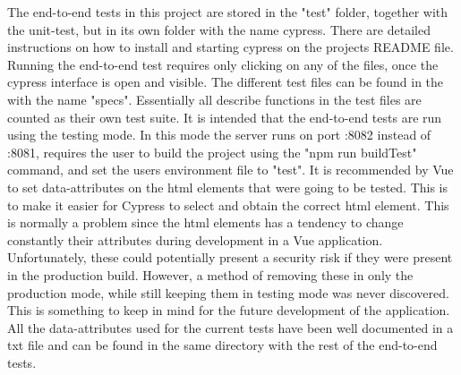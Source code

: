 The end-to-end tests in this project are stored in the "test" folder, together with the unit-test, but in its own folder with the name cypress. There are detailed instructions on how to install and starting cypress on the projects README file. Running the end-to-end test requires only clicking on any of the files, once the cypress interface is open and visible. The different test files can be found in the with the name "specs". Essentially all describe functions in the test files are counted as their own test suite. It is intended that the end-to-end tests are run using the testing mode. In this mode the server runs on port :8082 instead of :8081, requires the user to build the project using the "npm run buildTest" command, and set the users environment file to "test". It is recommended by Vue to set data-attributes on the html elements that were going to be tested. This is to make it easier for Cypress to select and obtain the correct html element. This is normally a problem since the html elements has a tendency to change constantly their attributes during development in a Vue application. Unfortunately, these could potentially present a security risk if they were present in the production build. However, a method of removing these in only the production mode, while still keeping them in testing mode was never discovered. This is something to keep in mind for the future development of the application. All the data-attributes used for the current tests have been well documented in a txt file and can be found in the same directory with the rest of the end-to-end tests.
